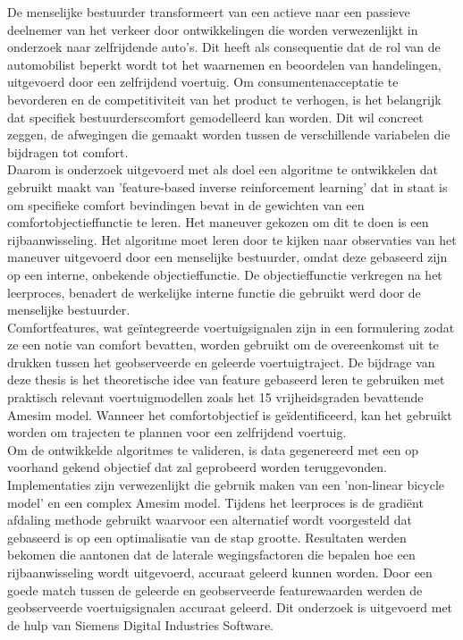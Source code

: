 \documentclass[master=ewtk,english]{kulemt}
\begin{document}
\begin{abstract*}
De menselijke bestuurder transformeert van een actieve naar een passieve deelnemer van het verkeer door ontwikkelingen die worden verwezenlijkt in onderzoek naar zelfrijdende auto's.  Dit heeft als consequentie dat de rol van de automobilist beperkt wordt tot het waarnemen en beoordelen van handelingen, uitgevoerd door een zelfrijdend voertuig.  Om consumentenacceptatie te bevorderen en de competitiviteit van het product te verhogen, is het belangrijk dat specifiek bestuurderscomfort gemodelleerd kan worden. Dit wil concreet zeggen, de afwegingen die gemaakt worden tussen de verschillende variabelen die bijdragen tot comfort.\\

Daarom is onderzoek uitgevoerd met als doel een algoritme te ontwikkelen dat gebruikt maakt van 'feature-based inverse reinforcement learning' dat in staat is om specifieke comfort bevindingen bevat in de gewichten van een comfortobjectieffunctie te leren. Het maneuver gekozen om dit te doen is een rijbaanwisseling. Het algoritme moet leren door te kijken naar observaties van het maneuver uitgevoerd door een menselijke bestuurder, omdat deze gebaseerd zijn op een interne, onbekende objectieffunctie. De objectieffunctie verkregen na het leerproces, benadert de werkelijke interne functie die gebruikt werd door de menselijke bestuurder.\\ Comfortfeatures, wat ge{\"i}ntegreerde voertuigsignalen zijn in een formulering zodat ze een notie van comfort bevatten, worden gebruikt om de overeenkomst uit te drukken tussen het geobserveerde en geleerde voertuigtraject. De bijdrage van deze thesis is het theoretische idee van feature gebaseerd leren te gebruiken met praktisch relevant voertuigmodellen zoals het 15 vrijheidsgraden bevattende Amesim model. Wanneer het comfortobjectief is ge{\"i}dentificeerd, kan het gebruikt worden om trajecten te plannen voor een zelfrijdend voertuig.\\

Om de ontwikkelde algoritmes te valideren, is data gegenereerd met een op voorhand gekend objectief dat zal geprobeerd worden teruggevonden. Implementaties zijn verwezenlijkt die gebruik maken van een 'non-linear bicycle model' en een complex Amesim model. Tijdens het leerproces is de gradi{\"e}nt afdaling methode gebruikt waarvoor een alternatief wordt voorgesteld dat gebaseerd is op een optimalisatie van de stap grootte.
Resultaten werden bekomen die aantonen dat de laterale wegingsfactoren die bepalen hoe een rijbaanwisseling wordt uitgevoerd, accuraat geleerd kunnen worden. Door een goede match tussen de geleerde en geobserveerde featurewaarden werden de geobserveerde voertuigsignalen accuraat geleerd. Dit onderzoek is uitgevoerd met de hulp van Siemens Digital Industries Software.  



  

\end{abstract*}
\end{document}
